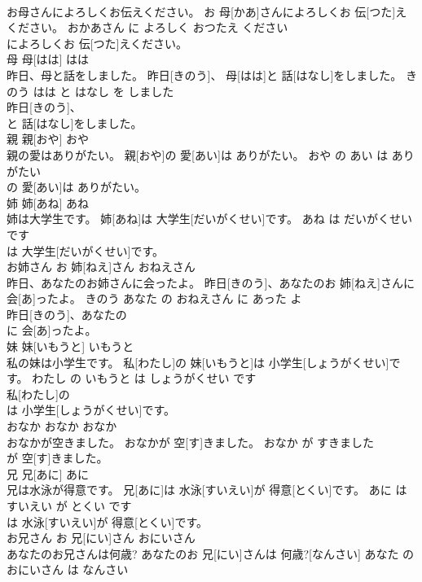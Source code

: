 \documentclass[8pt]{extreport}
\begin{document}
\begin{CJK}{UTF8}{min}
\\	お母さんによろしくお伝えください。	お 母[かあ]さんによろしくお 伝[つた]えください。	おかあさん に よろしく おつたえ ください	
\\	によろしくお 伝[つた]えください。		
\\	母	母[はは]	はは	
\\	昨日、母と話をしました。	昨日[きのう]、 母[はは]と 話[はなし]をしました。	きのう はは と はなし を しました	
\\	昨日[きのう]、
\\	と 話[はなし]をしました。		
\\	親	親[おや]	おや	
\\	親の愛はありがたい。	親[おや]の 愛[あい]は ありがたい。	おや の あい は ありがたい	
\\	の 愛[あい]は ありがたい。		
\\	姉	姉[あね]	あね	
\\	姉は大学生です。	姉[あね]は 大学生[だいがくせい]です。	あね は だいがくせい です	
\\	は 大学生[だいがくせい]です。		
\\	お姉さん	お 姉[ねえ]さん	おねえさん	
\\	昨日、あなたのお姉さんに会ったよ。	昨日[きのう]、あなたのお 姉[ねえ]さんに 会[あ]ったよ。	きのう あなた の おねえさん に あった よ	
\\	昨日[きのう]、あなたの
\\	に 会[あ]ったよ。		
\\	妹	妹[いもうと]	いもうと	
\\	私の妹は小学生です。	私[わたし]の 妹[いもうと]は 小学生[しょうがくせい]です。	わたし の いもうと は しょうがくせい です	
\\	私[わたし]の
\\	は 小学生[しょうがくせい]です。		
\\	おなか	おなか	おなか	
\\	おなかが空きました。	おなかが 空[す]きました。	おなか が すきました	
\\	が 空[す]きました。		
\\	兄	兄[あに]	あに	
\\	兄は水泳が得意です。	兄[あに]は 水泳[すいえい]が 得意[とくい]です。	あに は すいえい が とくい です	
\\	は 水泳[すいえい]が 得意[とくい]です。		
\\	お兄さん	お 兄[にい]さん	おにいさん	
\\	あなたのお兄さんは何歳?	あなたのお 兄[にい]さんは 何歳?[なんさい]	あなた の おにいさん は なんさい	

\end{CJK}
\end{document}
